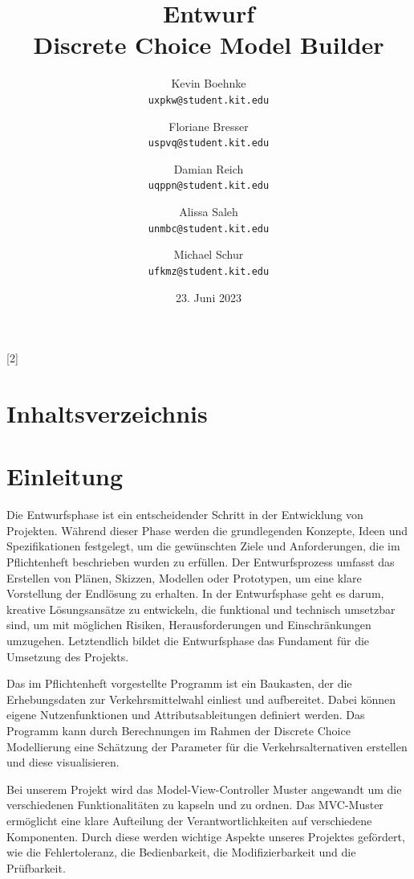 \documentclass{article}
\title{Entwurf \\ \large Discrete Choice Model Builder}
\author{Kevin Boehnke \\ \texttt{uxpkw@student.kit.edu}
\and Floriane Bresser \\ \texttt{uspvq@student.kit.edu}
\and Damian Reich \\ \texttt{uqppn@student.kit.edu}
\and Alissa Saleh \\ \texttt{unmbc@student.kit.edu}
\and Michael Schur \\ \texttt{ufkmz@student.kit.edu}}
\date{23. Juni 2023}
\begin{document}
\maketitle
\newpage
\startcontents[maintableofcontents]
[2]{\section*{Inhaltsverzeichnis}}
\thispagestyle{empty}
\newpage
{}

\section{Einleitung}
Die Entwurfsphase ist ein entscheidender Schritt in der Entwicklung von Projekten. Während dieser Phase werden die grundlegenden Konzepte, Ideen und Spezifikationen festgelegt, um die gewünschten Ziele und Anforderungen, die im Pflichtenheft beschrieben wurden zu erfüllen. Der Entwurfsprozess umfasst das Erstellen von Plänen, Skizzen, Modellen oder Prototypen, um eine klare Vorstellung der Endlösung zu erhalten.
In der Entwurfsphase geht es darum, kreative Lösungsansätze zu entwickeln, die funktional und technisch umsetzbar sind, um mit möglichen Risiken, Herausforderungen und Einschränkungen umzugehen.
Letztendlich bildet die Entwurfsphase das Fundament für die Umsetzung des Projekts. 

Das im Pflichtenheft vorgestellte Programm ist ein Baukasten, der die Erhebungsdaten zur Verkehrsmittelwahl einliest und aufbereitet. Dabei können eigene Nutzenfunktionen und Attributsableitungen definiert werden. Das Programm kann durch Berechnungen im Rahmen der Discrete Choice Modellierung eine Schätzung der Parameter für die Verkehrsalternativen erstellen und diese visualisieren.

Bei unserem Projekt wird das Model-View-Controller Muster angewandt um die verschiedenen Funktionalitäten zu kapseln und zu ordnen.
Das MVC-Muster ermöglicht eine klare Aufteilung der Verantwortlichkeiten auf verschiedene Komponenten.
Durch diese werden wichtige Aspekte unseres Projektes gefördert, wie die Fehlertoleranz, die Bedienbarkeit, die Modifizierbarkeit und die Prüfbarkeit.
\end{document}
